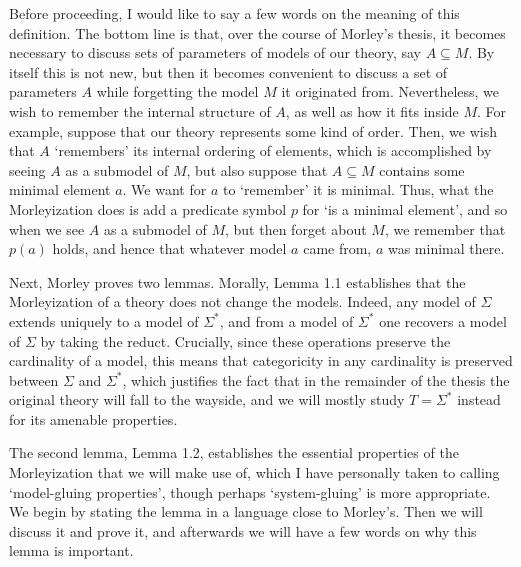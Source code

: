 \documentclass{article}
\theoremstyle{nonumberplain}
\begin{document}
Before proceeding, I would like to say a few words on the meaning of this definition. The bottom line is that, over the course of Morley's thesis, it becomes necessary to discuss sets of parameters of models of our theory, say $A \subseteq M$. By itself this is not new, but then it becomes convenient to discuss a set of parameters $A$ while forgetting the model $M$ it originated from. Nevertheless, we wish to remember the internal structure of $A$, as well as how it fits inside $M$. For example, suppose that our theory represents some kind of order. Then, we wish that $A$ `remembers' its internal ordering of elements, which is accomplished by seeing $A$ as a submodel of $M$, but also suppose that $A \subseteq M$ contains some minimal element $a$. We want for $a$ to `remember' it is minimal. Thus, what the Morleyization does is add a predicate symbol $p$ for `is a minimal element', and so when we see $A$ as a submodel of $M$, but then forget about $M$, we remember that $p(a)$ holds, and hence that whatever model $a$ came from, $a$ was minimal there.

Next, Morley proves two lemmas. Morally, Lemma 1.1 establishes that the Morleyization of a theory does not change the models. Indeed, any model of $\Sigma$ extends uniquely to a model of $\Sigma^*$, and from a model of $\Sigma^*$ one recovers a model of $\Sigma$ by taking the reduct. Crucially, since these operations preserve the cardinality of a model, this means that categoricity in any cardinality is preserved between $\Sigma$ and $\Sigma^*$, which justifies the fact that in the remainder of the thesis the original theory will fall to the wayside, and we will mostly study $T = \Sigma^*$ instead for its amenable properties.

The second lemma, Lemma 1.2, establishes the essential properties of the Morleyization that we will make use of, which I have personally taken to calling `model-gluing properties', though perhaps `system-gluing' is more appropriate. We begin by stating the lemma in a language close to Morley's. Then we will discuss it and prove it, and afterwards we will have a few words on why this lemma is important.
\end{document}
